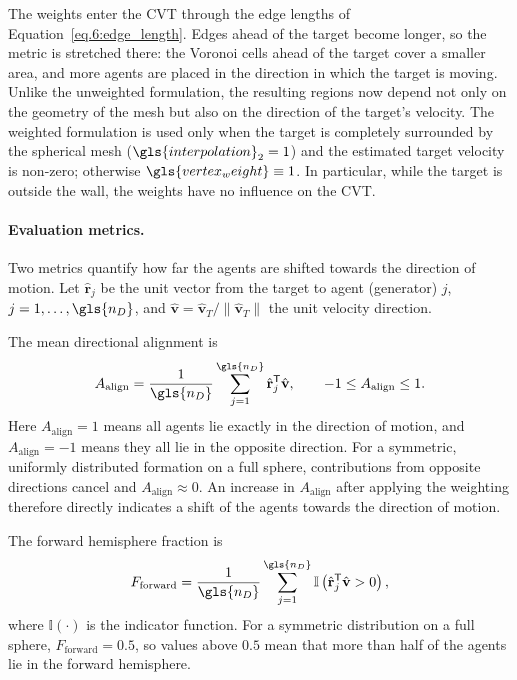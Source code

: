 The weights enter the \gls{CVT} through the edge lengths of Equation~\eqref{eq.6:edge_length}. Edges ahead of the target become longer, so the metric is stretched there: the Voronoi cells ahead of the target cover a smaller area, and more agents are placed in the direction in which the target is moving. Unlike the unweighted formulation, the resulting regions now depend not only on the geometry of the mesh but also on the direction of the target's velocity. The weighted formulation is used only when the target is completely surrounded by the spherical mesh ($\gls{interpolation}_2 = 1$) and the estimated target velocity is non-zero; otherwise $\gls{vertex_weight}\equiv1$. In particular, while the target is outside the wall, the weights have no influence on the \gls{CVT}.

\paragraph{Evaluation metrics.}
Two metrics quantify how far the agents are shifted towards the direction of motion. Let $\hat{\mathbf{r}}_j$ be the unit vector from the target to agent (generator) $j$, $j=1,\dots,\gls{n_D}$, and $\hat{\mathbf{v}}=\hat{\mathbf{v}}_T/\|\hat{\mathbf{v}}_T\|$ the unit velocity direction.

The mean directional alignment is
\begin{equation}
    A_{\mathrm{align}}
    =
    \frac{1}{\gls{n_D}}
    \sum_{j=1}^{\gls{n_D}}
    \hat{\mathbf{r}}_j^{\mathsf{T}}\hat{\mathbf{v}},
    \qquad -1 \leq A_{\mathrm{align}} \leq 1.
    \label{eq:mean_directional_alignment}
\end{equation}
Here $A_{\mathrm{align}}=1$ means all agents lie exactly in the direction of motion, and $A_{\mathrm{align}}=-1$ means they all lie in the opposite direction. For a symmetric, uniformly distributed formation on a full sphere, contributions from opposite directions cancel and $A_{\mathrm{align}}\approx 0$. An increase in $A_{\mathrm{align}}$ after applying the weighting therefore directly indicates a shift of the agents towards the direction of motion.

The forward hemisphere fraction is
\begin{equation}
    F_{\mathrm{forward}}
    =
    \frac{1}{\gls{n_D}}
    \sum_{j=1}^{\gls{n_D}}
    \mathbb{I}
    \left(
        \hat{\mathbf{r}}_j^{\mathsf{T}}\hat{\mathbf{v}} > 0
    \right),
    \label{eq:forward_hemisphere_fraction}
\end{equation}
where $\mathbb{I}(\cdot)$ is the indicator function. For a symmetric distribution on a full sphere, $F_{\mathrm{forward}}=0.5$, so values above $0.5$ mean that more than half of the agents lie in the forward hemisphere.

